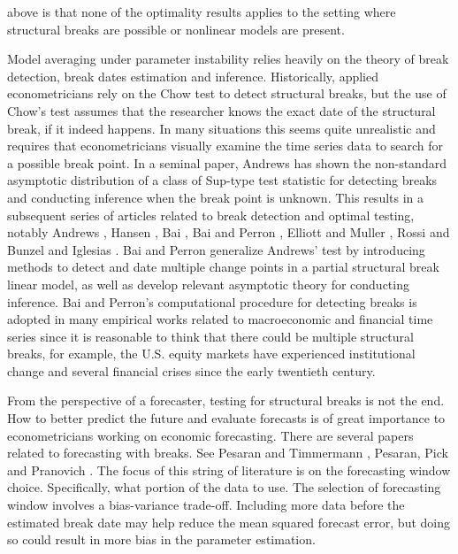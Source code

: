 above is that none of the optimality results applies to the setting where structural breaks are possible or nonlinear models are present.

Model averaging under parameter instability relies heavily on the theory of break detection, break dates estimation and inference. Historically, applied econometricians rely on the Chow test to detect structural breaks, but the use of Chow's test assumes that the researcher knows the exact date of the structural break, if it indeed happens. In many situations this seems quite unrealistic and requires that econometricians visually examine the time series data to search for a possible break point. In a seminal paper, Andrews \cite{andrews93} has shown the non-standard asymptotic distribution of a class of Sup-type test statistic for detecting breaks and conducting inference when the break point is unknown. This results in a subsequent series of articles related to break detection and optimal testing, notably Andrews \cite{andrews_ploberger94} \cite{andrews2003}, Hansen \cite{hansen_JE2000}, Bai \cite{bai_ET1997} \cite{bai_JE1999}, Bai and Perron \cite{bai_perron98}, Elliott and Muller \cite{elliott_muller_RES2006}, Rossi \cite{rossi_ET2005} and Bunzel and Iglesias \cite{bunzel_iglesias}. Bai and Perron \cite{bai_perron98} generalize Andrews' test by introducing methods to detect and date multiple change points in a partial structural break linear model, as well as develop relevant asymptotic theory for conducting inference. Bai and Perron's computational procedure for detecting breaks is adopted in many empirical works related to macroeconomic and financial time series since it is reasonable to think that there could be multiple structural breaks, for example, the U.S. equity markets have experienced institutional change and several financial crises since the early twentieth century.

From the perspective of a forecaster, testing for structural breaks is not the end. How to better predict the future and evaluate forecasts is of great importance to econometricians working on economic forecasting. There are several papers related to forecasting with breaks. See Pesaran and Timmermann \cite{pesaran_timmermann_JE2007}, Pesaran, Pick and Pranovich \cite{pesaran_pick_pranovich_2011}. The focus of this string of literature is on the forecasting window choice. Specifically, what portion of the data to use. The selection of forecasting window involves a bias-variance trade-off. Including more data before the estimated break date may help reduce the mean squared forecast error, but doing so could result in more bias in the parameter estimation.

